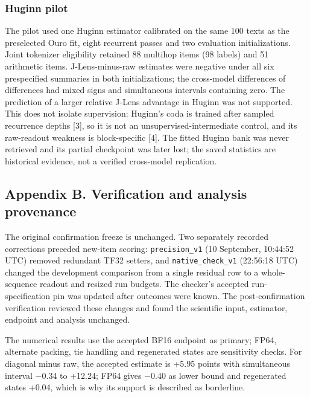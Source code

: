 \documentclass[
  british,
  11pt,
  a4paper,
]{article}
\begin{document}
\subsubsection{Huginn pilot}\label{huginn-pilot}

The pilot used one Huginn estimator calibrated on the same 100 texts as
the preselected Ouro fit, eight recurrent passes and two evaluation
initializations. Joint tokenizer eligibility retained 88 multihop items
(98 labels) and 51 arithmetic items. J-Lens-minus-raw estimates were
negative under all six prespecified summaries in both initializations;
the cross-model differences of differences had mixed signs and
simultaneous intervals containing zero. The prediction of a larger
relative J-Lens advantage in Huginn was not supported. This does not
isolate supervision: Huginn's coda is trained after sampled recurrence
depths {[}3{]}, so it is not an unsupervised-intermediate control, and
its raw-readout weakness is block-specific {[}4{]}. The fitted Huginn
bank was never retrieved and its partial checkpoint was later lost; the
saved statistics are historical evidence, not a verified cross-model
replication.

\newpage

\subsection{Appendix B. Verification and analysis
provenance}\label{appendix-b.-verification-and-analysis-provenance}

The original confirmation freeze is unchanged. Two separately recorded
corrections preceded new-item scoring: \texttt{precision\_v1} (10
September, 10:44:52 UTC) removed redundant TF32 setters, and
\texttt{native\_check\_v1} (22:56:18 UTC) changed the development
comparison from a single residual row to a whole-sequence readout and
resized run budgets. The checker's accepted run-specification pin was
updated after outcomes were known. The post-confirmation verification
reviewed these changes and found the scientific input, estimator,
endpoint and analysis unchanged.

The numerical results use the accepted BF16 endpoint as primary; FP64,
alternate packing, tie handling and regenerated states are sensitivity
checks. For diagonal minus raw, the accepted estimate is +5.95 points
with simultaneous interval −0.34 to +12.24; FP64 gives −0.40 as lower
bound and regenerated states +0.04, which is why its support is
described as borderline.
\end{document}
